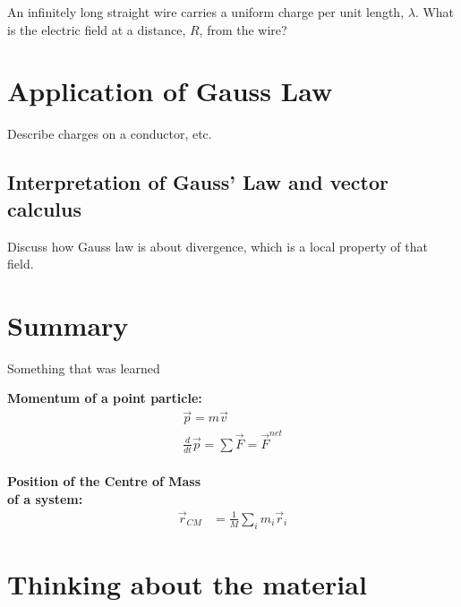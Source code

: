 \begin{example}{An infinitely long straight wire carries a uniform charge per unit length, $\lambda$. What is the electric field at a distance, $R$, from the wire?}

\end{example}


\section{Application of Gauss Law}
Describe charges on a conductor, etc.
\subsection{Interpretation of Gauss' Law and vector calculus}
Discuss how Gauss law is about divergence, which is a local property of that field. 

\newpage
\section{Summary}

\begin{chapterSummary}
 Something that was learned
\end{chapterSummary}

\newpage
\begin{importantEquations}
\medskip
\begin{multicols}{2}
\textbf{Momentum of a point particle:}
\begin{align*}
\vec p = m\vec v \\
\frac{d}{dt}\vec p = \sum \vec F = \vec F^{net}
\end{align*}
\columnbreak
\\
\textbf{Position of the Centre of Mass \\ of a system:}
\begin{align*}
\vec r_{CM} &=\frac{1}{M}\sum_i m_i\vec r_i 
\end{align*}
\medskip
\end{multicols}
\end{importantEquations}

\newpage
\section{Thinking about the material}

